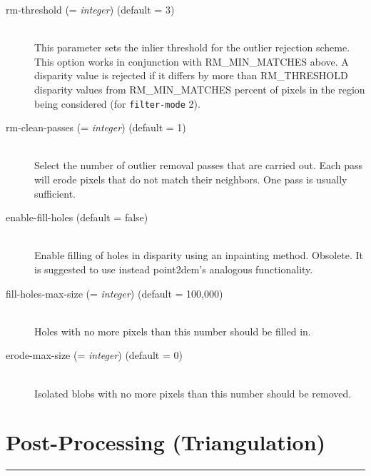\begin{description}
\item[rm-threshold \textnormal{\small{(= \emph{integer})}} (default = 3)] \hfill \\
  This parameter sets the inlier threshold for the outlier rejection
  scheme.  This option works in conjunction with RM\_MIN\_MATCHES
  above.  A disparity value is rejected if it differs by more than
  RM\_THRESHOLD disparity values from RM\_MIN\_MATCHES percent of
  pixels in the region being considered  (for \texttt{filter-mode} 2).

\item[rm-clean-passes \textnormal{\small{(= \emph{integer})}} (default = 1)] \hfill \\
  Select the number of outlier removal passes that are carried out.
  Each pass will erode pixels that do not match their neighbors.  One
  pass is usually sufficient.

\item[enable-fill-holes (default = false)] \hfill \\

Enable filling of holes in disparity using an inpainting
method. Obsolete. It is suggested to use instead point2dem's analogous
functionality.

\item[fill-holes-max-size \textnormal{\small{(= \emph{integer})}} (default = 100,000)] \hfill \\
  Holes with no more pixels than this number should be filled in.

\item[erode-max-size \textnormal{\small{(= \emph{integer})}} (default = 0)] \hfill \\
  Isolated blobs with no more pixels than this number should be removed.

\end{description}


\section{Post-Processing (Triangulation)}
\label{triangulation_options}
\hrule
\bigskip

